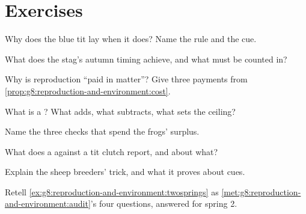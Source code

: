 \section{Exercises}

\begin{exercise}[$\star$]\label{exo:g8:reproduction-and-environment:1}
Why does the blue tit lay when it does? Name the rule and
the cue.
\end{exercise}

\begin{exercise}[$\star$]\label{exo:g8:reproduction-and-environment:2}
What does the stag's autumn timing achieve, and what must
be counted in?
\end{exercise}

\begin{exercise}[$\star$]\label{exo:g8:reproduction-and-environment:3}
Why is reproduction ``paid in matter''? Give three
payments from
\cref{prop:g8:reproduction-and-environment:cost}.
\end{exercise}

\begin{exercise}[$\star$]\label{exo:g8:reproduction-and-environment:4}
What is a ? What adds, what subtracts, what
sets the ceiling?
\end{exercise}

\begin{exercise}[$\star$]\label{exo:g8:reproduction-and-environment:5}
Name the three checks that spend the frogs' surplus.
\end{exercise}

\begin{exercise}[$\star$]\label{exo:g8:reproduction-and-environment:6}
What does a  against a  tit clutch report,
and about what?
\end{exercise}

\begin{exercise}[$\star\star$]\label{exo:g8:reproduction-and-environment:7}
Explain the sheep breeders'  trick, and what it
proves about cues.
\end{exercise}

\begin{exercise}[$\star\star$]\label{exo:g8:reproduction-and-environment:8}
Retell \cref{ex:g8:reproduction-and-environment:twosprings}
as \cref{met:g8:reproduction-and-environment:audit}'s
four questions, answered for spring 2.
\end{exercise}

